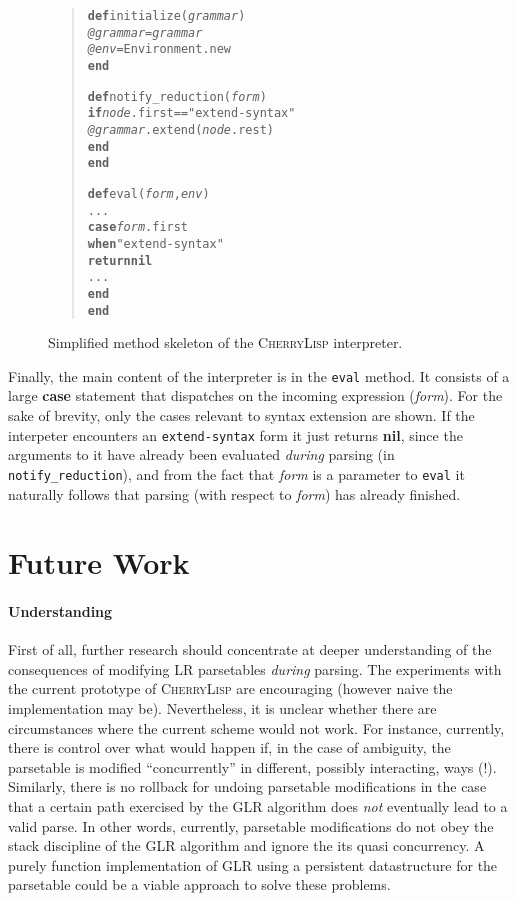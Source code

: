 \documentclass[a4paper]{llncs}
\def\cherrylisp{\textsc{CherryLisp}\xspace}
\def\mytextbf#1{\textrm{\textbf{#1}}}
\def\mytextit#1{\textrm{\textit{#1}}}
\def\End{\mytextbf{end}}
\def\If{\mytextbf{if}}
\def\Var#1{\mytextit{#1}}
\def\Case{\mytextbf{case}}
\def\Def{\mytextbf{def}}
\def\When{\mytextbf{when}}
\def\Return{\mytextbf{return}}
\def\Nil{\mytextbf{nil}}
\begin{document}
\begin{figure}
\small
\begin{quote}
\begin{minipage}[t]{0.55\linewidth}
\begin{alltt}
\Def initialize(\Var{grammar})
  \Var{@grammar} = \Var{grammar}
  \Var{@env} = Environment.new
\End

\Def notify_reduction(\Var{form})
  \If \Var{node}.first == "extend-syntax"
    \Var{@grammar}.extend(\Var{node}.rest)
  \End
\End
\end{alltt}
\end{minipage}
\begin{minipage}[t]{0.5\linewidth}
\begin{alltt}
\Def eval(\Var{form}, \Var{env})
  ...
  \Case \Var{form}.first
   \When "extend-syntax" 
     \Return \Nil
    ...
  \End
\End
\end{alltt}
\end{minipage}
\end{quote}
\caption{Simplified method skeleton of the \cherrylisp
  interpreter.\label{FIG:eval}}
\end{figure}
Finally, the main content of the interpreter is in the \texttt{eval}
method. It consists of a large \textbf{case} statement that dispatches
on the incoming expression (\textit{form}). For the sake of brevity,
only the cases relevant to syntax extension are shown. If the
interpeter encounters an \texttt{extend-syntax} form it just returns
\textbf{nil}, since the arguments to it have already been evaluated
\textit{during} parsing (in \texttt{notify\_reduction}), and from the
fact that \textit{form} is a parameter to \texttt{eval} it naturally
follows that parsing (with respect to \textit{form}) has already
finished. 

\section{Future Work}

\paragraph{Understanding} First of all, further research should
concentrate at deeper understanding of the consequences of modifying
LR parsetables \textit{during} parsing. The experiments with the
current prototype of \cherrylisp are encouraging (however naive the
implementation may be). Nevertheless, it is unclear whether there are
circumstances where the current scheme would not work. For instance,
currently, there is control over what would happen if, in the case of
ambiguity, the parsetable is modified ``concurrently'' in different,
possibly interacting, ways (!). Similarly, there is no rollback for
undoing parsetable modifications in the case that a certain path
exercised by the GLR algorithm does \textit{not} eventually lead to a
valid parse. In other words, currently, parsetable modifications do
not obey the stack discipline of the GLR algorithm and ignore the its
quasi concurrency. A purely function implementation of GLR using a
persistent datastructure for the parsetable could be a viable approach
to solve these problems.
\end{document}
